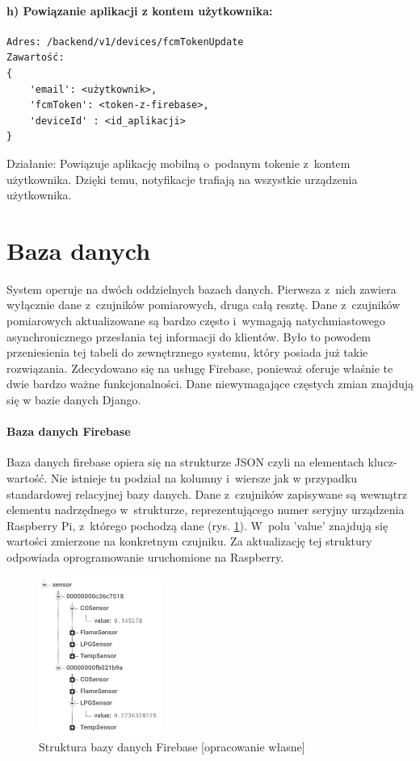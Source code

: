 \paragraph{h) Powiązanie aplikacji z kontem użytkownika:}
\begin{verbatim}
Adres: /backend/v1/devices/fcmTokenUpdate
Zawartość: 
{
	'email': <użytkownik>, 
	'fcmToken': <token-z-firebase>, 
	'deviceId' : <id_aplikacji>
}
\end{verbatim}
Działanie: Powiązuje aplikację mobilną o~podanym tokenie z~kontem użytkownika. Dzięki temu, notyfikacje trafiają na wszystkie urządzenia użytkownika.
\newline

\section{Baza danych}
System operuje na dwóch oddzielnych bazach danych. Pierwsza z~nich zawiera wyłącznie dane z~czujników pomiarowych, druga całą resztę. Dane z~czujników pomiarowych aktualizowane są bardzo często i~wymagają natychmiastowego asynchronicznego przesłania tej informacji do klientów. Było to powodem przeniesienia tej tabeli do zewnętrznego systemu, który posiada już takie rozwiązania. Zdecydowano się na usługę Firebase, ponieważ oferuje właśnie te dwie bardzo ważne funkcjonalności.  Dane niewymagające częstych zmian znajdują się w bazie danych Django.

\paragraph{Baza danych Firebase}
Baza danych firebase opiera się na strukturze JSON czyli na elementach klucz-wartość. Nie istnieje tu podział na kolumny i~wiersze jak w przypadku standardowej relacyjnej bazy danych. Dane z~czujników zapisywane są wewnątrz elementu nadrzędnego w~strukturze, reprezentującego numer seryjny urządzenia Raspberry Pi, z~którego pochodzą dane (rys. \ref{json}). W~polu 'value' znajdują się wartości zmierzone na konkretnym czujniku.  Za aktualizację tej struktury odpowiada oprogramowanie uruchomione na Raspberry.
\begin{figure}[H]
   \centering
   \includegraphics[width=4cm]{firebasejson.png} 
   \caption{Struktura bazy danych Firebase [opracowanie własne]}
   \label{json}
\end{figure}

